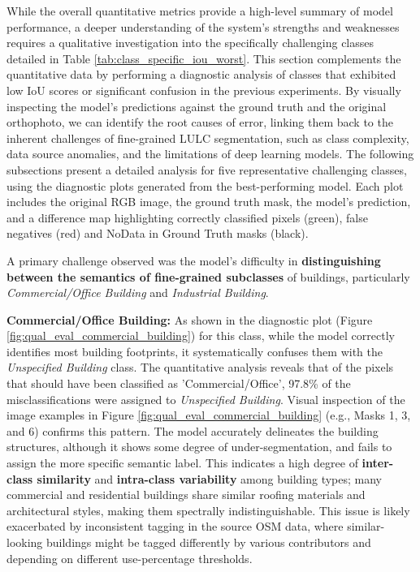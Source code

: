 \documentclass{report}
\begin{document}
While the overall quantitative metrics provide a high-level summary of model performance, a deeper understanding of the system's strengths and weaknesses requires a qualitative investigation into the specifically challenging classes detailed in Table \ref{tab:class_specific_iou_worst}. This section complements the quantitative data by performing a diagnostic analysis of classes that exhibited low IoU scores or significant confusion in the previous experiments. By visually inspecting the model's predictions against the ground truth and the original orthophoto, we can identify the root causes of error, linking them back to the inherent challenges of fine-grained LULC segmentation, such as class complexity, data source anomalies, and the limitations of deep learning models.
The following subsections present a detailed analysis for five representative challenging classes, using the diagnostic plots generated from the best-performing model. Each plot includes the original RGB image, the ground truth mask, the model's prediction, and a difference map highlighting correctly classified pixels (green), false negatives (red) and NoData in Ground Truth masks (black). \par
A primary challenge observed was the model's difficulty in \textbf{distinguishing between the semantics of fine-grained subclasses} of buildings, particularly \textit{Commercial/Office Building} and \textit{Industrial Building}. \par
\textbf{Commercial/Office Building:} As shown in the diagnostic plot (Figure \ref{fig:qual_eval_commercial_building}) for this class, while the model correctly identifies most building footprints, it systematically confuses them with the \textit{Unspecified Building} class. The quantitative analysis reveals that of the pixels that should have been classified as 'Commercial/Office', 97.8\% of the misclassifications were assigned to \textit{Unspecified Building}. Visual inspection of the image examples in Figure \ref{fig:qual_eval_commercial_building} (e.g., Masks 1, 3, and 6) confirms this pattern. The model accurately delineates the building structures, although it shows some degree of under-segmentation, and fails to assign the more specific semantic label. This indicates a high degree of \textbf{inter-class similarity} and \textbf{intra-class variability} among building types; many commercial and residential buildings share similar roofing materials and architectural styles, making them spectrally indistinguishable. This issue is likely exacerbated by inconsistent tagging in the source OSM data, where similar-looking buildings might be tagged differently by various contributors and depending on different use-percentage thresholds. \par
\end{document}
